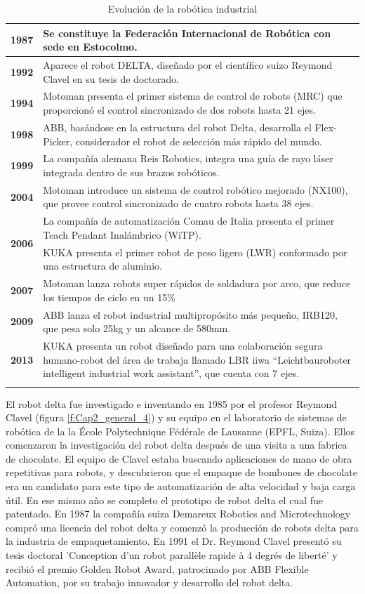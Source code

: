 \begin{longtable}[c]{c m{12cm}}
     \textbf{1987} & Se constituye la Federación Internacional de Robótica con sede en Estocolmo. \\ \hline
     \textbf{1992} & Aparece el robot DELTA, diseñado por el científico suizo Reymond Clavel en su tesis de doctorado. \\ \hline
     \textbf{1994} & Motoman presenta el primer sistema de control de robots (MRC) que proporcionó el control sincronizado de dos robots hasta 21 ejes. \\ \hline
     \textbf{1998} & ABB, basándose en la estructura del robot Delta, desarrolla el Flex-Picker, considerador el robot de selección más rápido del mundo. \\ \hline
     \textbf{1999} & La compañía alemana Reis Robotics, integra una guía de rayo láser integrada dentro de sus brazos robóticos. \\ \hline
     \textbf{2004} & Motoman introduce un sistema de control robótico mejorado (NX100), que provee control sincronizado de cuatro robots hasta 38 ejes. \\ \hline
     \multirow{2}{*}{\textbf{2006}} & La compañía de automatización Comau de Italia presenta el primer Teach Pendant Inalámbrico (WiTP). \\ \cline{2-2}
        & KUKA presenta el primer robot de peso ligero (LWR) conformado por una estructura de aluminio. \\ \hline
     \textbf{2007} & Motoman lanza robots super rápidos de soldadura por arco, que reduce los tiempos de ciclo en un 15\% 
     \\ \hline
     \textbf{2009} &  ABB lanza el robot industrial multipropósito más pequeño, IRB120, que pesa solo 25kg y un alcance de 580mm. \\ \hline
     \textbf{2013} & KUKA presenta un robot diseñado para una colaboración segura humano-robot del área de trabaja llamado LBR iiwa “Leichtbauroboter intelligent industrial work assistant”, que cuenta con 7 ejes. \\ \hline
    \caption{Evolución de la robótica industrial}
 \end{longtable}
 
    El robot delta fue investigado e inventando en 1985 por el profesor Reymond Clavel (figura \eqref{f:Cap2_general_4}) y su equipo en el laboratorio de sistemas de robótica de la la École Polytechnique Fédérale de Lausanne (EPFL, Suiza). Ellos comenzaron la investigación del robot delta después de una visita a una fabrica de chocolate. El equipo de Clavel estaba buscando aplicaciones de mano de obra repetitivas para robots, y descubrieron que el empaque de bombones de chocolate era un candidato para este tipo de automatización de alta velocidad y baja carga útil. En ese mismo año se completo el prototipo de robot delta el cual fue patentado. En 1987 la compañía suiza Demareux Robotics and Microtechnology compró una licencia del robot delta y comenzó la producción de robots delta para la industria de empaquetamiento. En 1991 el Dr. Reymond Clavel presentó su tesis doctoral 'Conception d'un robot parallèle rapide à 4 degrés de liberté' y recibió el premio Golden Robot Award, patrocinado por ABB Flexible Automation, por su trabajo innovador y desarrollo del robot delta.


